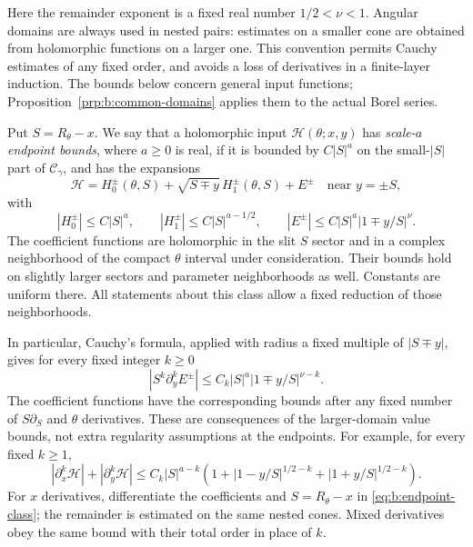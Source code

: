 \documentclass[a4paper,10pt]{article}
\numberwithin{equation}{section}
\theoremstyle{paperplain}
\theoremstyle{paperremark}
\theoremstyle{paperplain}
\begin{document}
Here the remainder exponent is a fixed real number
$1/2<\nu<1$. Angular domains are always used in nested pairs:
estimates on a smaller cone are obtained from holomorphic functions
on a larger one. This convention permits Cauchy estimates of any
fixed order, and avoids a loss of derivatives in a finite-layer
induction. The bounds below concern general input functions;
Proposition~\ref{prp:b:common-domains} applies them to the actual
Borel series.

Put $S=R_\theta-x$. We say that a holomorphic input
$\mathcal H(\theta;x,y)$ has \emph{scale-$a$ endpoint bounds},
where $a\geq0$ is real, if it is bounded by $C|S|^a$ on the small-$|S|$
part of $\mathcal C_\gamma$, and has the expansions
\begin{equation}\label{eq:b:endpoint-class}
 \mathcal H
 =H_0^\pm(\theta,S)+\sqrt{S\mp y}\,H_1^\pm(\theta,S)+E^\pm
                 \quad\text{near }y=\pm S,
\end{equation}
with
\begin{equation}\label{eq:b:endpoint-norms}
 |H_0^\pm|\leq C|S|^a,\qquad
 |H_1^\pm|\leq C|S|^{a-1/2},\qquad
 |E^\pm|\leq C|S|^a|1\mp y/S|^\nu.
\end{equation}
The coefficient functions are holomorphic in the slit $S$ sector
and in a complex neighborhood of the compact $\theta$ interval
under consideration. Their bounds hold on slightly larger sectors
and parameter neighborhoods as well. Constants are uniform there.
All statements about this class allow a fixed reduction of those
neighborhoods.

In particular, Cauchy's formula, applied with radius a fixed
multiple of $|S\mp y|$, gives for every fixed integer $k\geq0$
\begin{equation}\label{eq:b:remainder-derivatives}
 |S^k\partial_y^k E^\pm|
       \leq C_k|S|^a|1\mp y/S|^{\nu-k}.
\end{equation}
The coefficient functions have the corresponding bounds after any
fixed number of $S\partial_S$ and $\theta$ derivatives. These are
consequences of the larger-domain value bounds, not extra regularity
assumptions at the endpoints. For example, for every fixed $k\geq1$,
\begin{equation}\label{eq:b:input-derivatives}
 |\partial_x^k\mathcal H|+|\partial_y^k\mathcal H|
 \leq C_k|S|^{a-k}
 \left(1+|1-y/S|^{1/2-k}+|1+y/S|^{1/2-k}\right).
\end{equation}
For $x$ derivatives, differentiate the coefficients and
$S=R_\theta-x$ in \eqref{eq:b:endpoint-class}; the remainder is
estimated on the same nested cones. Mixed derivatives obey the
same bound with their total order in place of $k$.
\end{document}
